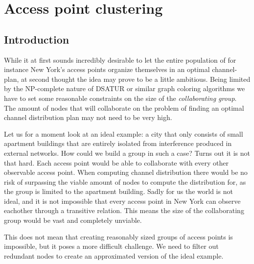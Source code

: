 \chapter{Access point clustering}



\section{Introduction}
While it at first sounds incredibly desirable to let the entire population of for instance New York's access points organize themselves in an optimal channel-plan,
at second thought the idea may prove to be a little ambitious. Being limited by the NP-complete nature of DSATUR or similar graph coloring algorithms
we have to set some reasonable constraints on the size of the \textit{collaborating group}. The amount of nodes that will collaborate on the problem of finding an optimal channel distribution
plan may not need to be very high.

Let us for a moment look at an ideal example: a city that only consists of small apartment buildings that are entirely isolated from interference produced in external networks.
How could we build a group in such a case? Turns out it is not that hard. Each access point would be able to collaborate with every other observable access point.
When computing channel distribution there would be no risk of surpassing the viable amount of nodes to compute the distribution for, as the group is limited to the apartment building. Sadly for us the world is not ideal,
and it is not impossible that every access point in New York can observe eachother through a transitive relation. This means the size of
the collaborating group would be vast and completely unviable.  

This does not mean that creating reasonably sized groups of access points is impossible, but it poses a more difficult challenge. 
We need to filter out redundant nodes to create an approximated version of the ideal example.

